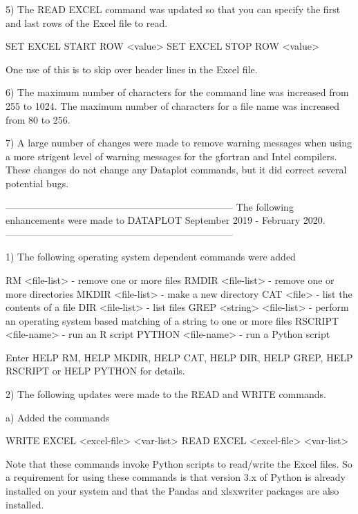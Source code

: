  5) The READ EXCEL command was updated so that you can specify the
    first and last rows of the Excel file to read.

        SET EXCEL START ROW <value>
        SET EXCEL STOP  ROW <value>

    One use of this is to skip over header lines in the Excel file.

 6) The maximum number of characters for the command line was
    increased from 255 to 1024.  The maximum number of characters
    for a file name was increased from 80 to 256.

 7) A large number of changes were made to remove warning messages
    when using a more strigent level of warning messages for the
    gfortran and Intel compilers.  These changes do not change
    any Dataplot commands, but it did correct several potential
    bugs.

-----------------------------------------------------------------------
The following enhancements were made to DATAPLOT
September 2019 - February 2020.
-----------------------------------------------------------------------

 1) The following operating system dependent commands were added

      RM      <file-list>    - remove one or more files
      RMDIR   <file-list>    - remove one or more directories
      MKDIR   <file-list>    - make a new directory
      CAT     <file>         - list the contents of a file
      DIR     <file-list>    - list files
      GREP <string> <file-list> - perform an operating system based
                                  matching of a string to one or more
                                  files
      RSCRIPT <file-name>    - run an R script
      PYTHON <file-name>     - run a Python script

    Enter HELP RM, HELP MKDIR, HELP CAT, HELP DIR, HELP GREP,
    HELP RSCRIPT or HELP PYTHON for details.

 2) The following updates were made to the READ and WRITE commands.

    a) Added the commands

          WRITE EXCEL <excel-file>  <var-list>
          READ  EXCEL <excel-file>  <var-list>

       Note that these commands invoke Python scripts to read/write the
       Excel files.  So a requirement for using these commands is that
       version 3.x of Python is already installed on your system and that
       the Pandas and xlsxwriter packages are also installed.

